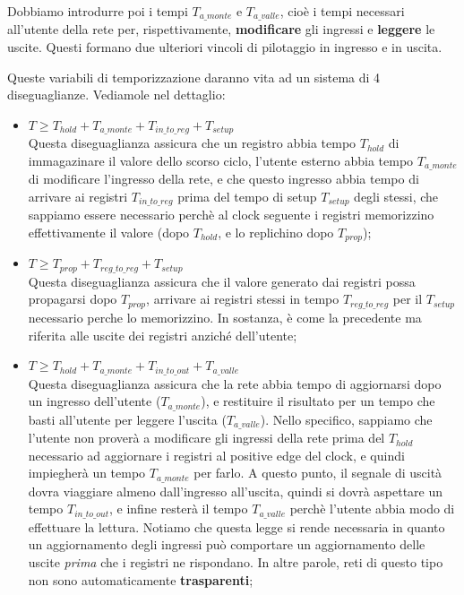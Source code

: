 \documentclass[a4paper,11pt]{article}
\begin{document}
Dobbiamo introdurre poi i tempi $T_{a\_monte}$ e $T_{a\_valle}$, cioè i tempi necessari all'utente della rete per, rispettivamente, \textbf{modificare} gli ingressi e \textbf{leggere} le uscite.
Questi formano due ulteriori vincoli di pilotaggio in ingresso e in uscita.

Queste variabili di temporizzazione daranno vita ad un sistema di 4 diseguaglianze. Vediamole nel dettaglio:
\begin{itemize}
	\item $T \geq T_{hold} + T_{a\_monte} + T_{in\_to\_reg} + T_{setup}$ \\ 
		Questa diseguaglianza assicura che un registro abbia tempo $T_{hold}$ di immagazinare il valore dello scorso ciclo, l'utente esterno abbia tempo $T_{a\_monte}$ di modificare l'ingresso della rete, e che questo ingresso abbia tempo di arrivare ai registri $T_{in\_to\_reg}$ prima del tempo di setup $T_{setup}$ degli stessi, che sappiamo essere necessario perchè al clock seguente i registri memorizzino effettivamente il valore (dopo $T_{hold}$, e lo replichino dopo $T_{prop}$);
	\item $T \geq T_{prop} + T_{reg\_to\_reg} + T_{setup}$ \\ 
		Questa diseguaglianza assicura che il valore generato dai registri possa propagarsi dopo $T_{prop}$, arrivare ai registri stessi in tempo $T_{reg\_to\_reg}$ per il $T_{setup}$ necessario perche lo memorizzino.
		In sostanza, è come la precedente ma riferita alle uscite dei registri anziché dell'utente;
	\item $T \geq T_{hold} + T_{a\_monte} + T_{in\_to\_out} + T_{a\_valle}$ \\
		Questa diseguaglianza assicura che la rete abbia tempo di aggiornarsi dopo un ingresso dell'utente ($T_{a\_monte}$), e restituire il risultato per un tempo che basti all'utente per leggere l'uscita ($T_{a\_valle}$).
		Nello specifico, sappiamo che l'utente non proverà a modificare gli ingressi della rete prima del $T_{hold}$ necessario ad aggiornare i registri al positive edge del clock, e quindi impiegherà un tempo $T_{a\_monte}$ per farlo.
		A questo punto, il segnale di uscità dovra viaggiare almeno dall'ingresso all'uscita, quindi si dovrà aspettare un tempo $T_{in\_to\_out}$, e infine resterà il tempo $T_{a\_valle}$ perchè l'utente abbia modo di effettuare la lettura.
		Notiamo che questa legge si rende necessaria in quanto un aggiornamento degli ingressi può comportare un aggiornamento delle uscite \textit{prima} che i registri ne rispondano.
		In altre parole, reti di questo tipo non sono automaticamente \textbf{trasparenti};

\end{itemize}
\end{document}
